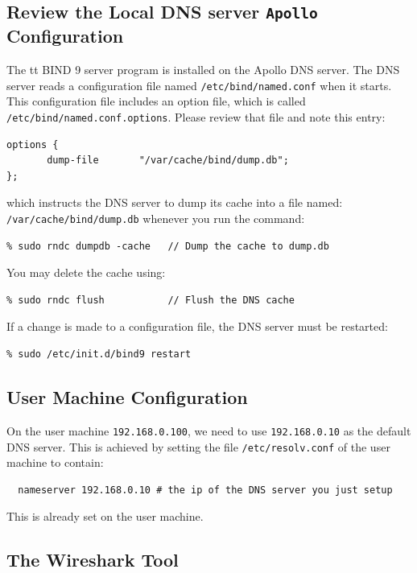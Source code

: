 \subsection{Review the Local DNS server {\tt Apollo} Configuration} 

The {tt BIND 9} server program is installed on the Apollo DNS server.
The DNS server reads a configuration file named
{\tt /etc/bind/named.conf} when it starts. This configuration file includes an option 
file, which is called {\tt /etc/bind/named.conf.options}.  Please 
review that file and note this entry:
\begin{verbatim}
options {
       dump-file       "/var/cache/bind/dump.db";
};
\end{verbatim}

\noindent which instructs the DNS server to dump its cache into
a file named: \texttt{/var/cache/bind/dump.db} 
whenever you run the command:
\begin{verbatim}
% sudo rndc dumpdb -cache 	// Dump the cache to dump.db  
\end{verbatim}
\noindent You may delete the cache using:
\begin{verbatim}
% sudo rndc flush         	// Flush the DNS cache
\end{verbatim}


If a change is made to a configuration file, the DNS server must be
restarted:
\begin{verbatim}
% sudo /etc/init.d/bind9 restart
\end{verbatim}


\subsection{User Machine Configuration} 
\label{subsec:user_machine}

On the user machine {\tt 192.168.0.100}, we need to use 
{\tt 192.168.0.10} as the default DNS server. This is achieved by 
setting the file \texttt{/etc/resolv.conf} of the user machine to contain:

\begin{verbatim}
  nameserver 192.168.0.10 # the ip of the DNS server you just setup
\end{verbatim}

\noindent
This is already set on the user machine.

\subsection{The Wireshark Tool}

